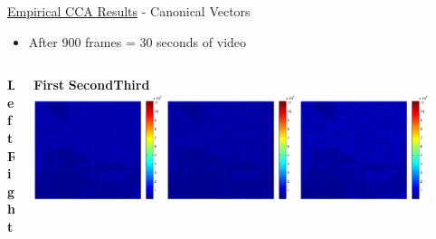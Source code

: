 \documentclass[8pt]{beamer}
\begin{document}
\begin{frame}{\href{run:/home/asendorf/Documents/thesis_videos/flashing_cca.mp4}{Empirical
      CCA Results} -
    Canonical Vectors}

  \begin{itemize}
  \item After 900 frames = 30 seconds of video  
  \end{itemize}

  \begin{columns}
    \begin{column}{0.1\textwidth}
      \textbf{Left}\\
      \vspace{15ex}
      \textbf{Right}\\
    \end{column}
    \begin{column}{0.9\textwidth}
      \begin{center}
        \textbf{First} \hspace{15ex} \textbf{Second}\hspace{15ex}\textbf{Third}\\[1ex]
        \includegraphics[width=0.3\textwidth]{figures/flashing_cca_wx1.pdf}\hspace{1ex}
        \includegraphics[width=0.3\textwidth]{figures/flashing_cca_wx2.pdf}\hspace{1ex}
        \includegraphics[width=0.3\textwidth]{figures/flashing_cca_wx3.pdf}\\[2ex]

\end{center}
\end{column}
\end{columns}
\end{frame}
\end{document}
